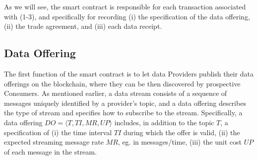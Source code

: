 \documentclass[letterpaper, 10 pt, conference]{ieeeconf}  %
\newcommand{\topic}{\ensuremath{\mathit{T}}}
\newcommand{\ti}{\ensuremath{\mathit{TI}}}
\newcommand{\mr}{\ensuremath{\mathit{MR}}}
\newcommand{\up}{\ensuremath{\mathit{UP}}}
\newcommand{\doff}{\ensuremath{\mathit{DO}}}
\begin{document}
As we will see, the smart contract is responsible for each transaction associated with (1-3), and specifically for recording (i) the specification of the data offering, (ii) the trade agreement, and (iii) each data receipt.

\subsection{Data Offering}

The first function of the smart contract is to let data Providers publish their data offerings on the blockchain, where they can be then discovered by prospective Consumers. 
As mentioned earlier, a data stream consists of a sequence of messages uniquely identified by  a provider's topic, and a data offering describes the type of stream and specifies how to subscribe to the stream.
Specifically, a data offering $\doff = \langle \topic, \ti, \mr, \up \rangle$ includes, in addition to the topic \topic, a specification of (i) the time interval \ti{} during which the offer is valid, (ii) the expected streaming message rate \mr, eg. in messages/time, (iii) the unit cost \up{} of each message in the stream.

%
%
%
%

%
\end{document}

